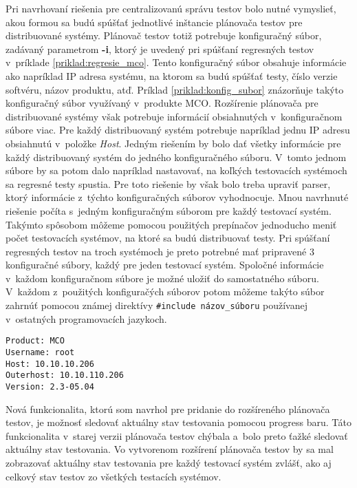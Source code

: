 Pri navrhovaní riešenia pre centralizovanú správu testov bolo nutné 
vymyslieť, akou formou sa budú spúšťať jednotlivé inštancie plánovača testov pre 
distribuované systémy. Plánovač testov totiž potrebuje konfiguračný súbor,
zadávaný parametrom \textbf{-i}, ktorý je uvedený pri spúšťaní regresných testov
v~príklade \ref{priklad:regresie_mco}.
Tento konfiguračný súbor obsahuje informácie ako napríklad IP adresa systému, na ktorom sa 
budú spúšťať testy, číslo verzie softvéru, názov 
produktu, atď. Príklad \ref{priklad:konfig_subor} znázorňuje takýto 
konfiguračný súbor využívaný v~produkte MCO. 
Rozšírenie plánovača pre distribuované systémy však potrebuje informácií 
obsiahnutých v~konfiguračnom súbore viac.
Pre každý distribuovaný systém potrebuje napríklad jednu IP adresu 
obsiahnutú v~položke \textit{Host}.
Jedným riešením by bolo dať všetky informácie pre každý distribuovaný 
systém do jedného konfiguračného súboru.
V~tomto jednom súbore by sa potom dalo napríklad nastavovať, na koľkých 
testovacích systémoch sa regresné testy spustia.
Pre toto riešenie by však bolo treba upraviť parser, ktorý informácie 
z~týchto konfiguračných súborov vyhodnocuje.
Mnou navrhnuté riešenie počíta s~jedným konfiguračným súborom pre 
každý testovací systém. Takýmto spôsobom môžeme pomocou použitých prepínačov
jednoducho meniť počet testovacích systémov, na ktoré sa budú distribuovať testy.
Pri spúšťaní regresných testov na troch systémoch je preto potrebné 
mať pripravené 3 konfiguračné súbory, každý pre jeden testovací systém. 
Spoločné informácie v~každom konfiguračnom súbore je možné uložiť do 
samostatného súboru. V~každom z~použitých konfiguračých súborov potom môžeme 
takýto súbor zahrnúť pomocou známej direktívy \texttt{\#include názov\_súboru} 
používanej v~ostatných programovacích jazykoch.

\begin{lstlisting}[caption=Konfiguračný súbor pre produkt MCO,label=priklad:konfig_subor]
Product: MCO
Username: root
Host: 10.10.10.206
Outerhost: 10.10.110.206
Version: 2.3-05.04
\end{lstlisting}

Nová funkcionalita, ktorú som navrhol pre pridanie do rozšíreného 
plánovača testov, je možnosť sledovať aktuálny stav testovania pomocou 
progress baru. 
Táto funkcionalita v~starej verzii plánovača testov chýbala a~bolo 
preto ťažké sledovať aktuálny stav testovania. 
Vo vytvorenom rozšírení plánovača testov by sa mal zobrazovať aktuálny stav 
testovania pre každý testovací systém zvlášť, ako aj celkový stav testov
zo všetkých testacích systémov.

